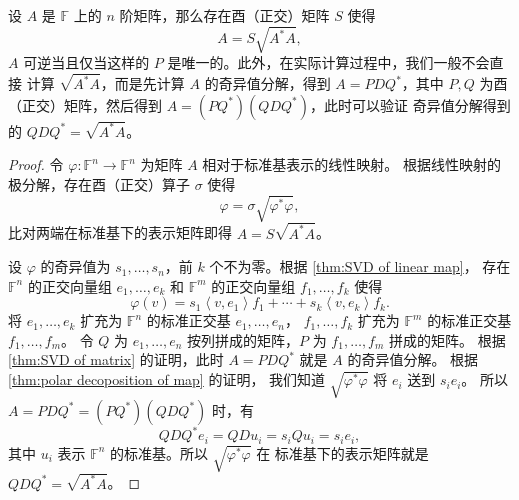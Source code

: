 \documentclass[fontset=none,zihao=-4]{Notes}
\newcommand{\inn}[1]{\left\langle#1\right\rangle}
\begin{document}
\begin{theorem}[矩阵的极分解]
  设 $A$ 是 $\mathbb{F}$ 上的 $n$ 阶矩阵，那么存在酉（正交）矩阵
  $S$ 使得
  \[
    A=S\sqrt{A^*A},  
  \]
  $A$ 可逆当且仅当这样的 $P$ 是唯一的。此外，在实际计算过程中，我们一般不会直接
  计算 $\sqrt{A^*A}$，而是先计算 $A$ 的奇异值分解，得到 $A=PDQ^*$，其中
  $P,Q$ 为酉（正交）矩阵，然后得到 $A=(PQ^*)(QDQ^*)$，此时可以验证
  奇异值分解得到的 $QDQ^*=\sqrt{A^*A}$。
\end{theorem}
\begin{proof}
  令 $\varphi:\mathbb{F}^n\to\mathbb{F}^n$ 为矩阵 $A$ 相对于标准基表示的线性映射。
  根据线性映射的极分解，存在酉（正交）算子 $\sigma$ 使得
  \[
    \varphi=\sigma\sqrt{\varphi^*\varphi},  
  \]
  比对两端在标准基下的表示矩阵即得 $A=S\sqrt{A^*A}$。

  设 $\varphi$ 的奇异值为 $s_1,\dots,s_n$，前 $k$ 个不为零。根据 \autoref{thm:SVD of linear map}，
  存在 $\mathbb{F}^n$ 的正交向量组 $e_1,\dots,e_k$ 和 $\mathbb{F}^m$ 的正交向量组
  $f_1,\dots,f_k$ 使得
  \[
    \varphi(v)=s_1\inn{v,e_1}f_1+\cdots+s_k\inn{v,e_k}f_k.
  \]
  将 $e_1,\dots,e_k$ 扩充为 $\mathbb{F}^n$ 的标准正交基 $e_1,\dots,e_n$，
   $f_1,\dots,f_k$ 扩充为 $\mathbb{F}^m$ 的标准正交基 $f_1,\dots,f_m$。
  令 $Q$ 为 $e_1,\dots,e_n$ 按列拼成的矩阵，$P$ 为 $f_1,\dots,f_m$ 拼成的矩阵。
  根据 \autoref{thm:SVD of matrix} 的证明，此时 $A=PDQ^*$ 就是 $A$ 的奇异值分解。
  根据 \autoref{thm:polar decoposition of map} 的证明，
  我们知道 $\sqrt{\varphi^*\varphi}$ 将 $e_i$ 送到 $s_ie_i$。 
  所以 $A=PDQ^*=(PQ^*)(QDQ^*)$ 时，有
  \[
    QDQ^*e_i=QDu_i=s_iQu_i=s_ie_i,
  \]
  其中 $u_i$ 表示 $\mathbb{F}^n$ 的标准基。所以 $\sqrt{\varphi^*\varphi}$ 在
  标准基下的表示矩阵就是 $QDQ^*=\sqrt{A^*A}$。
\end{proof}
\end{document}
